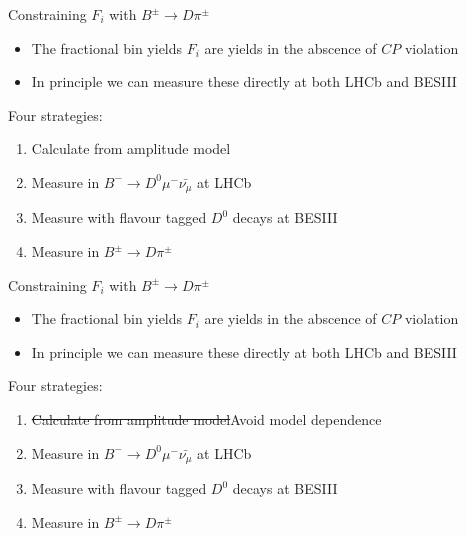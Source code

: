 \documentclass{beamer}
\begin{document}
\begin{frame}{Constraining $F_i$ with $B^\pm\to D\pi^\pm$}
  \begin{itemize}
    \setlength\itemsep{1.0em}
    \item{The fractional bin yields $F_i$ are yields in the abscence of $C\!P$ violation}
    \item{In principle we can measure these directly at both LHCb and BESIII}
  \end{itemize}
  \begin{center}
    Four strategies:
  \end{center}
  \begin{enumerate}
    \setlength\itemsep{1.0em}
    \item{Calculate from amplitude model}
    \item{Measure in $B^-\to D^0\mu^-\bar{\nu_\mu}$ at LHCb}
    \item{Measure with flavour tagged $D^0$ decays at BESIII}
    \item{Measure in $B^\pm\to D\pi^\pm$}
  \end{enumerate}
  \vspace{0.1cm}
  \begin{center}
  \end{center}
\end{frame}

\begin{frame}{Constraining $F_i$ with $B^\pm\to D\pi^\pm$}
  \begin{itemize}
    \setlength\itemsep{1.0em}
    \item{The fractional bin yields $F_i$ are yields in the abscence of $C\!P$ violation}
    \item{In principle we can measure these directly at both LHCb and BESIII}
  \end{itemize}
  \begin{center}
    Four strategies:
  \end{center}
  \begin{enumerate}
    \setlength\itemsep{1.0em}
    \item{\sout{Calculate from amplitude model}\quad Avoid model dependence}
    \item{Measure in $B^-\to D^0\mu^-\bar{\nu_\mu}$ at LHCb}
    \item{Measure with flavour tagged $D^0$ decays at BESIII}
    \item{Measure in $B^\pm\to D\pi^\pm$}
  \end{enumerate}
  \vspace{0.1cm}
  \begin{center}
  \end{center}
\end{frame}
\end{document}
